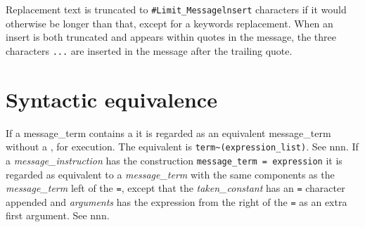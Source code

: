 Replacement text is truncated to \texttt{\#Limit\_Messagelnsert}
characters if it would otherwise be longer than that, except for a
keywords replacement. When an insert is both truncated and appears
within quotes in the message, the three characters
\texttt{\textquotesingle{}...\textquotesingle{}} are inserted in the
message after the trailing quote.

\section{Syntactic equivalence}\label{syntactic-equivalence}

If a message\_term contains a
\texttt{\textquotesingle{}{[}\textquotesingle{}} it is regarded as an
equivalent message\_term without a
\texttt{\textquotesingle{}{[}\textquotesingle{}}, for execution. The
equivalent is
\texttt{term\textasciitilde{}\textquotesingle{}{[}{]}\textquotesingle{}(expression\_list)}.
See nnn. If a \emph{message\_instruction} has the construction
\texttt{message\_term\ \textquotesingle{}=\textquotesingle{}\ expression}
it is regarded as equivalent to a \emph{message\_term} with the same
components as the \emph{message\_term} left of the
\texttt{\textquotesingle{}=\textquotesingle{}}, except that the
\emph{taken\_constant} has an
\texttt{\textquotesingle{}=\textquotesingle{}} character appended and
\emph{arguments} has the expression from the right of the
\texttt{\textquotesingle{}=\textquotesingle{}} as an extra first
argument. See nnn.
